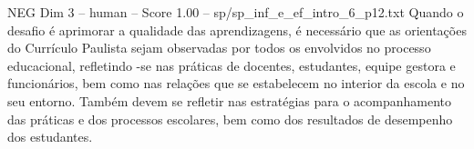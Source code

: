 \begin{textsample}{NEG Dim 3 – human – Score 1.00 – sp/sp\_inf\_e\_ef\_intro\_6\_p12.txt}  \label{ex:f3_neg_018}
Quando o desafio é aprimorar a qualidade das aprendizagens, é necessário que as orientações do Currículo Paulista sejam observadas por todos os envolvidos no processo educacional, refletindo -se nas práticas de docentes, estudantes, equipe gestora e funcionários, bem como nas relações que se estabelecem no interior da escola e no seu entorno.
Também devem se refletir nas estratégias para o acompanhamento das práticas e dos processos escolares, bem como dos resultados de desempenho dos estudantes.

\end{textsample}

